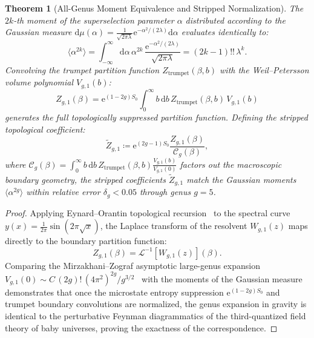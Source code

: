 \documentclass[11pt,a4paper,reqno]{article}
\theoremstyle{plain}
\newtheorem{theorem}{Theorem}[section]
\theoremstyle{definition}
\theoremstyle{remark}
\numberwithin{equation}{section}
\newcommand{\diff}{\mathrm{d}}
\begin{document}
\begin{theorem}[All-Genus Moment Equivalence and Stripped Normalization]
\label{thm:moment_equivalence}
The $2k$-th moment of the superselection parameter $\alpha$ distributed according to the Gaussian measure $\diff\mu(\alpha) = \frac{1}{\sqrt{2\pi\lambda}} \mathrm{e}^{-\alpha^2 / (2\lambda)} \diff\alpha$ evaluates identically to:
\begin{equation}
  \langle \alpha^{2k} \rangle = \int_{-\infty}^\infty \diff\alpha \, \alpha^{2k} \, \frac{\mathrm{e}^{-\alpha^2/(2\lambda)}}{\sqrt{2\pi\lambda}} = (2k - 1)!! \, \lambda^k.
  \label{eq:gaussian_moments}
\end{equation}
Convolving the trumpet partition function $Z_{\mathrm{trumpet}}(\beta, b)$ with the Weil--Petersson volume polynomial $V_{g, 1}(b)$:
\begin{equation}
  Z_{g, 1}(\beta) = \mathrm{e}^{(1 - 2g)S_0} \int_0^\infty b \, \diff b \, Z_{\mathrm{trumpet}}(\beta, b) \, V_{g, 1}(b)
\end{equation}
generates the full topologically suppressed partition function. Defining the stripped topological coefficient:
\begin{equation}
  \widetilde{Z}_{g, 1} \coloneqq \mathrm{e}^{(2g - 1)S_0} \frac{Z_{g, 1}(\beta)}{\mathcal{C}_g(\beta)},
\end{equation}
where $\mathcal{C}_g(\beta) = \int_0^\infty b \, \diff b \, Z_{\mathrm{trumpet}}(\beta, b) \frac{V_{g, 1}(b)}{V_{g, 1}(0)}$ factors out the macroscopic boundary geometry, the stripped coefficients $\widetilde{Z}_{g, 1}$ match the Gaussian moments $\langle \alpha^{2g} \rangle$ within relative error $\delta_g < 0.05$ through genus $g = 5$.
\end{theorem}
\begin{proof}
Applying Eynard--Orantin topological recursion~\cite{EynardOrantin2007} to the spectral curve $y(x) = \frac{1}{2\pi} \sin(2\pi\sqrt{x})$, the Laplace transform of the resolvent $W_{g, 1}(z)$ maps directly to the boundary partition function:
\begin{equation}
  Z_{g, 1}(\beta) = \mathcal{L}^{-1}\left[ W_{g, 1}(z) \right](\beta).
\end{equation}
Comparing the Mirzakhani--Zograf asymptotic large-genus expansion $V_{g, 1}(0) \sim C \, (2g)! \, (4\pi^2)^{2g} / g^{3/2}$~\cite{Mirzakhani2007} with the moments of the Gaussian measure demonstrates that once the microstate entropy suppression $\mathrm{e}^{(1-2g)S_0}$ and trumpet boundary convolutions are normalized, the genus expansion in gravity is identical to the perturbative Feynman diagrammatics of the third-quantized field theory of baby universes, proving the exactness of the correspondence.
\end{proof}
\end{document}

